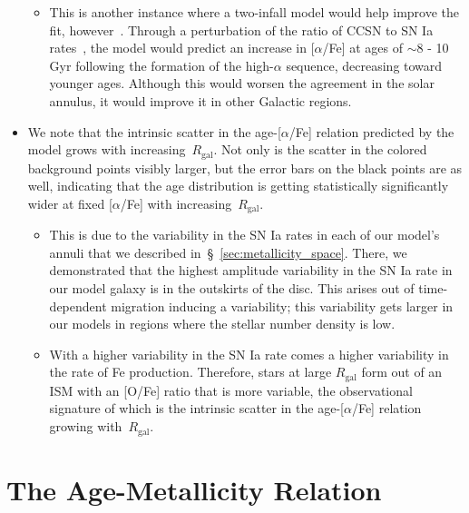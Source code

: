 \documentclass[fleqn, usenatbib]{mnras}
\begin{document}
\begin{itemize}
\begin{itemize}
		\item This is another instance where a two-infall model would help 
		improve the fit, however~\citep[e.g.][]{Chiappini1997, Chiappini2001, 
		Romano2010, Grisoni2017, Noguchi2018, Spitoni2016, Spitoni2018, 
		Spitoni2019, Spitoni2020}. Through a perturbation of 
		the ratio of CCSN to SN Ia rates~\citep[e.g.][]{Johnson2020}, the 
		model would predict an increase in [$\alpha$/Fe] at ages of 
		$\sim$8 - 10 Gyr following the formation of the high-$\alpha$ 
		sequence, decreasing toward younger ages. Although this would worsen 
		the agreement in the solar annulus, it would improve it in other 
		Galactic regions. 
	\end{itemize} 

	\item We note that the intrinsic scatter in the age-[$\alpha$/Fe] relation 
	predicted by the model grows with increasing~$R_\text{gal}$. Not only is 
	the scatter in the colored background points visibly larger, but the error 
	bars on the black points are as well, indicating that the age distribution 
	is getting statistically significantly wider at fixed [$\alpha$/Fe] with 
	increasing~$R_\text{gal}$. 
	\begin{itemize} 
		\item This is due to the variability in the SN Ia rates in each of 
		our model's annuli that we described in~\S~\ref{sec:metallicity_space}. 
		There, we demonstrated that the highest amplitude variability in the 
		SN Ia rate in our model galaxy is in the outskirts of the disc. This 
		arises out of time-dependent migration inducing a variability; this 
		variability gets larger in our models in regions where the stellar 
		number density is low. 

		\item With a higher variability in the SN Ia rate comes a higher 
		variability in the rate of Fe production. Therefore, stars at large 
		$R_\text{gal}$ form out of an ISM with an [O/Fe] ratio that is more 
		variable, the observational signature of which is the intrinsic 
		scatter in the age-[$\alpha$/Fe] relation growing with~$R_\text{gal}$. 
	\end{itemize} 
\end{itemize} 

\section{The Age-Metallicity Relation} 
\label{sec:amr} 
\end{document}
